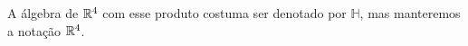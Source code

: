 A álgebra de $\mathbb{R}^4$ com esse produto costuma ser denotado por $\mathbb{H}$, mas manteremos a notação $\mathbb{R}^4$.

\begin{comment}

Por linearidade, deve valer
	\begin{align*}
	xy &= (x_0 1  + x_1 \ii + x_2 \jj + x_3 \kk)(y_0 1  + y_1 \ii + y_2 \jj + y_3 \kk) \\
		&= x_0 y_0 1  1  + x_0 y_1 1  \ii + x_0 y_2 1  \jj + x_0 y_3 1  \kk \\
		&+ x_1 y_0 \ii  1  + x_1 y_1 \ii  \ii + x_1y_2 \ii  \jj + x_1 y_3 \ii  \kk \\
		&+ x_2 y_0 \jj 1  + x_2 y_1 \jj \ii + x_2 y_2 \jj \jj + x_2 y_3 \jj \kk \\
		&+ x_3 y_0 \kk 1  + x_3 y_1 \kk \ii + x_3 y_2 \kk \jj + x_3 y_3 \kk \kk
	\end{align*}

Portanto basta definir os valores dos produtos entre $1,i,j,k$. Escolhendo $1$ para ser a unidade, já que deve haver uma unidade (e essa notação não foi escolhida por acaso para $(1,0,0,0)$), basta determinarmos
	\begin{equation*}
	\ii\ii,\ii\jj,\ii\kk,\jj\ii,\jj\ij,\jj\kk,\kk\ii,\kk\jj,\kk\kk.
	\end{equation*}

\begin{definition}
Seja $x \in \R^4$. A \emph{componente escalar} de $x$ é o número real
	\begin{equation*}
	\esc{x} := x_0 \in \R
	\end{equation*}
e a \emph{componente vetorial} de $x$ é o vetor real
	\begin{equation*}
	\vec{x} := (x_1,x_2,x_3) \in \R^3.
	\end{equation*}
Denota-se
	\begin{equation*}
	x = \esc{x} + \vec{x},
	\end{equation*}
em que $\esc{x}$ é entendido como $x_0 \bm 1$ e $\vec{x}$ é entendido como $x_1\bm \ii + x_2 \bm\jj + x_3 \bm \kk$. Os subespaços vetoriais de escalares e vetores são denotados, respectivamente, $\esc{\HH}$ e $\vec{\HH}$, e temos portanto
	\begin{equation*}
	\HH = \esc{\HH} \oplus \vec{\HH} \simeq \R \oplus \R^3.
	\end{equation*}

O \emph{conjugado} de $x$ é
	\begin{equation*}
	\conju{x} := \esc{x}-\vec{x}.
	\end{equation*}

Um \emph{versor} é um quatérnio $u \in \HH$ tal que $\esc{u}=0$ e $\nor{\vec{u}}=1$.
\end{definition}

\end{comment}

